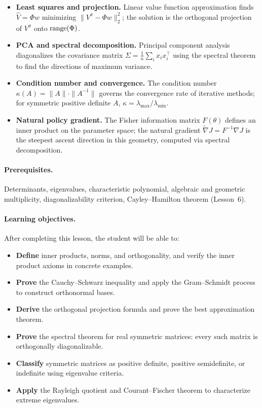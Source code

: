\documentclass[11pt,a4paper]{article}
\begin{document}
\begin{rlconnection}[title={Where Inner Products and Spectral Theory Appear in RL/ML}]
\begin{itemize}[nosep]
  \item \textbf{Least squares and projection.}
        Linear value function approximation finds $\hat{V} = \Phi w$
        minimizing $\|V^\pi - \Phi w\|_2^2$; the solution is the
        orthogonal projection of $V^\pi$ onto $\operatorname{range}(\Phi)$.
  \item \textbf{PCA and spectral decomposition.}
        Principal component analysis diagonalizes the covariance matrix
        $\Sigma = \frac{1}{n}\sum_i x_i x_i^\top$ using the spectral
        theorem to find the directions of maximum variance.
  \item \textbf{Condition number and convergence.}
        The condition number $\kappa(A) = \|A\| \cdot \|A^{-1}\|$
        governs the convergence rate of iterative methods; for symmetric
        positive definite $A$, $\kappa = \lambda_{\max}/\lambda_{\min}$.
  \item \textbf{Natural policy gradient.}
        The Fisher information matrix $F(\theta)$ defines an inner product
        on the parameter space; the natural gradient
        $\tilde{\nabla} J = F^{-1} \nabla J$ is the steepest ascent
        direction in this geometry, computed via spectral decomposition.
\end{itemize}
\end{rlconnection}

\paragraph{Prerequisites.}
Determinants, eigenvalues, characteristic polynomial, algebraic and
geometric multiplicity, diagonalizability criterion, Cayley--Hamilton
theorem (Lesson~6).

\paragraph{Learning objectives.}
After completing this lesson, the student will be able to:
\begin{itemize}[nosep]
  \item \textbf{Define} inner products, norms, and orthogonality, and
        verify the inner product axioms in concrete examples.
  \item \textbf{Prove} the Cauchy--Schwarz inequality and apply the
        Gram--Schmidt process to construct orthonormal bases.
  \item \textbf{Derive} the orthogonal projection formula and prove
        the best approximation theorem.
  \item \textbf{Prove} the spectral theorem for real symmetric matrices:
        every such matrix is orthogonally diagonalizable.
  \item \textbf{Classify} symmetric matrices as positive definite,
        positive semidefinite, or indefinite using eigenvalue criteria.
  \item \textbf{Apply} the Rayleigh quotient and Courant--Fischer theorem
        to characterize extreme eigenvalues.
\end{itemize}
\end{document}

